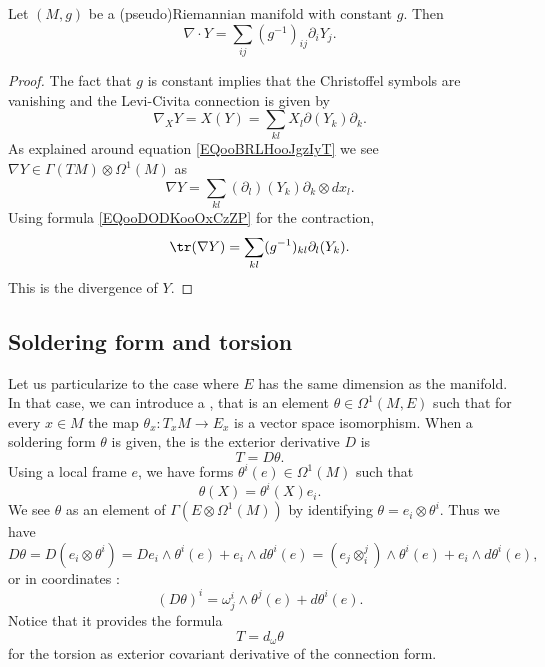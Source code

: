 \begin{proposition} \label{PROPooLIJTooKFTwPY}
    Let \( (M,g)\) be a (pseudo)Riemannian manifold with constant \( g\). Then
    \begin{equation}
        \nabla\cdot Y=\sum_{ij}(g^{-1})_{ij}\partial_iY_j.
    \end{equation}
\end{proposition}

\begin{proof}
    The fact that \( g\) is constant implies that the Christoffel symbols are vanishing and the Levi-Civita connection is given by 
    \begin{equation}
        \nabla_XY=X(Y)=\sum_{kl}X_l\partial(Y_k)\partial_k.
    \end{equation}
    As explained around equation \ref{EQooBRLHooJgzIyT} we see \( \nabla Y\in\Gamma(TM)\otimes \Omega^1(M)\) as
    \begin{equation}
        \nabla Y=\sum_{kl}(\partial_l)(Y_k)\partial_k\otimes dx_l.
    \end{equation}
    Using formula \eqref{EQooDODKooOxCzZP} for the contraction,
    \begin{equation}
        \tr(\nabla Y)=\sum_{kl}(g^{-1})_{kl}\partial_l(Y_k).
    \end{equation}
    This is the divergence of \( Y\).
\end{proof}

\subsection{Soldering form and torsion}

Let us particularize to the case where $E$ has the same dimension as the manifold. In that case, we can introduce a , that is an element $\theta\in \Omega^1(M,E)$ such that for every $x\in M$ the map $\theta_x\colon T_xM\to E_x$ is a vector space isomorphism.
When a soldering form $\theta$ is given, the  is the exterior derivative $D$ is
\begin{equation}
	T=D\theta.
\end{equation}
Using a local frame $e$, we have forms $\theta^i(e)\in\Omega^1(M)$ such that
\[ 
  \theta(X)=\theta^i(X)e_i.
\]
We see $\theta$ as an element of $\Gamma(E\otimes \Omega^1(M))$ by identifying $\theta=e_i\otimes\theta^i$. Thus we have
\[ 
D\theta=D(e_i\otimes\theta^i)	=De_i\wedge\theta^i(e)+e_i\wedge d\theta^i(e)
				=(e_j\otimes^j_i)\wedge\theta^i(e)+e_i\wedge d\theta^i(e),
\]
or in coordinates :
\begin{equation}
  (D\theta)^i=\omega_j^i\wedge \theta^j(e)+d\theta^i(e).
\end{equation}
Notice that it provides the formula
\begin{equation}
T=d_{\omega}\theta
\end{equation}
for the torsion as exterior covariant derivative of the connection form.

